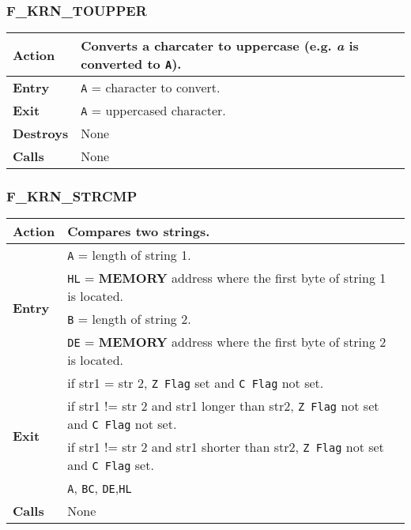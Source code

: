     \subsubsection{F\_KRN\_TOUPPER}
    \label{func:fkrntoupper}
    \begin{tabular}{l p{15cm}}
        \hline\textbf{Action}
        & Converts a charcater to uppercase (e.g. \textit{a} is converted to
        \texttt{A}).\\
        \hline\textbf{Entry} & \texttt{A} = character to convert.\\
        \hline\textbf{Exit} & \texttt{A} = uppercased character.\\
        \hline\textbf{Destroys} & None\\
        \hline\textbf{Calls} & None\\
        \hline
    \end{tabular}

    \subsubsection{F\_KRN\_STRCMP}
    \label{func:fkrnstrcmp}
    \begin{tabular}{l p{15cm}}
        \hline\textbf{Action}
        & Compares two strings.\\
        \hline\multirow[t]{4}{4em}{\textbf{Entry}}
        & \texttt{A} = length of string 1.\\
        & \texttt{HL} = \textbf{MEMORY} address where the first byte of
        string 1 is located.\\
        & \texttt{B} = length of string 2.\\
        & \texttt{DE} = \textbf{MEMORY} address where the first byte of
        string 2 is located.\\
        \hline\multirow[t]{4}{4em}{\textbf{Exit}}
        & if str1 = str 2, \texttt{Z Flag} set and \texttt{C Flag} not set.\\
        & if str1 != str 2 and str1 longer than str2, \texttt{Z Flag} not 
        set and \texttt{C Flag} not set.\\
        & if str1 != str 2 and str1 shorter than str2, \texttt{Z Flag} not 
        set and \texttt{C Flag} set.\\
        \hline\textbf{Destroys} & \texttt{A}, \texttt{BC}, \texttt{DE},\texttt{HL} \\
        \hline\textbf{Calls} & None\\
        \hline
    \end{tabular}

